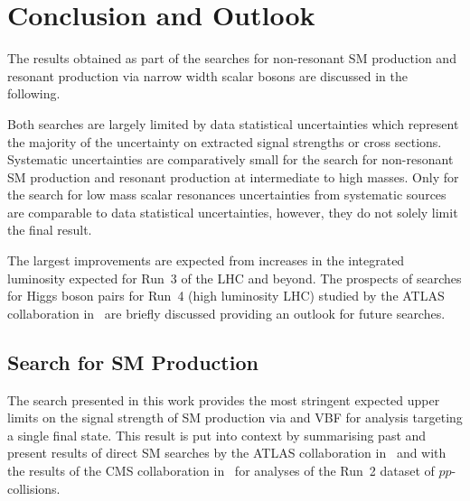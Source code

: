 \section{Conclusion and Outlook}%
\label{sec:result_discussion}


The results obtained as part of the searches for non-resonant SM \HH production
and resonant production via narrow width scalar bosons are discussed in the
following.

Both searches are largely limited by data statistical uncertainties which
represent the majority of the uncertainty on extracted signal strengths or cross
sections. Systematic uncertainties are comparatively small for the search for
non-resonant SM \HH production and resonant production at intermediate to high
masses. Only for the search for low mass scalar resonances uncertainties from
systematic sources are comparable to data statistical uncertainties, however,
they do not solely limit the final result.

The largest improvements are expected from increases in the integrated
luminosity expected for Run~3 of the LHC and beyond. The prospects of searches
for Higgs boson pairs for Run~4 (high luminosity LHC) studied by the ATLAS
collaboration in~\cite{ATL-PHYS-PUB-2021-044,ATL-PHYS-PUB-2022-005} are briefly
discussed providing an outlook for future searches.


\subsection{Search for SM \HH Production}

The search presented in this work provides the most stringent expected upper
limits on the signal strength of SM \HH production via \ggF and VBF for analysis
targeting a single final state. This result is put into context by summarising
past and present results of direct SM \HH searches by the ATLAS collaboration
in~ and with the results of the CMS
collaboration in~ for analyses of the Run~2 dataset of
$pp$-collisions.

